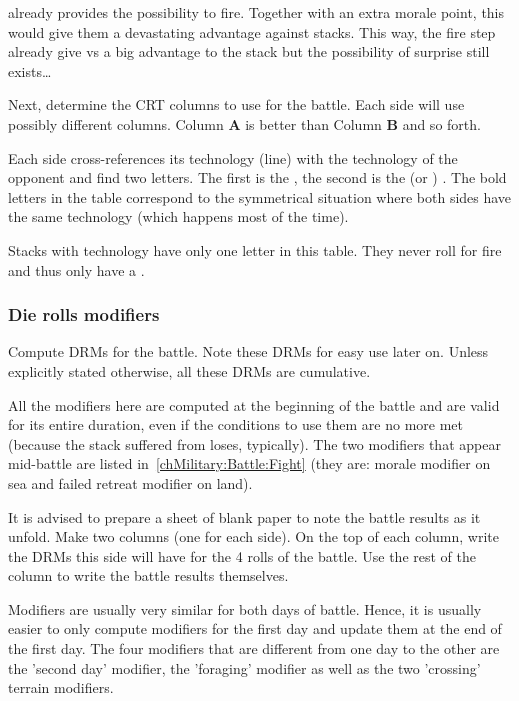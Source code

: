 \begin{designnote}
  \TREN already provides the possibility to fire. Together with an extra
  morale point, this would give them a devastating advantage against \TMED
  stacks. This way, the fire step already give \TREN vs \TMED a big advantage
  to the \TREN stack but the possibility of surprise still exists\ldots
\end{designnote}

Next, determine the CRT columns to use for the battle. Each side will use
possibly different columns. Column \textbf{A} is better than Column \textbf{B}
and so forth.

Each side cross-references its technology (line) with the technology of the
opponent and find two letters. The first is the , the
second is the  (or ) . The bold
letters in the table correspond to the symmetrical situation where both sides
have the same technology (which happens most of the time).

Stacks with \TMED technology have only one letter in this table. They never
roll for fire and thus only have a .

\subsubsection{Die rolls modifiers}
Compute DRMs for the battle. Note these DRMs for easy use later on. Unless
explicitly stated otherwise, all these DRMs are cumulative.

All the modifiers here are computed at the beginning of the battle and are
valid for its entire duration, even if the conditions to use them are no more
met (because the stack suffered from loses, typically). The two modifiers that
appear mid-battle are listed in~\ref{chMilitary:Battle:Fight} (they are:
morale modifier on sea and failed retreat modifier on land).

\begin{playtip}
  It is advised to prepare a sheet of blank paper to note the battle results
  as it unfold. Make two columns (one for each side). On the top of each
  column, write the DRMs this side will have for the 4 rolls of the battle. Use
  the rest of the column to write the battle results themselves.

  Modifiers are usually very similar for both days of battle. Hence, it is
  usually easier to only compute modifiers for the first day and update them
  at the end of the first day. The four modifiers that are different from one
  day to the other are the 'second day' modifier, the 'foraging' modifier as
  well as the two 'crossing' terrain modifiers.
\end{playtip}

